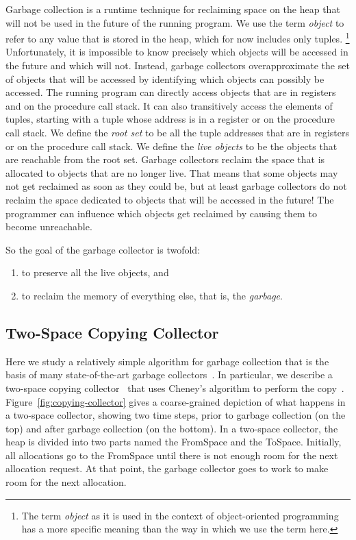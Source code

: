 \documentclass[7x10]{TimesAPriori_MIT}%
\numberwithin{theorem}{chapter}
\numberwithin{definition}{chapter}
\numberwithin{equation}{chapter}
\begin{document}
Garbage collection is a runtime technique for reclaiming space on the
heap that will not be used in the future of the running program. We
use the term \emph{object} to refer to any
value that is stored in the heap, which for now includes only
tuples.%
%
\footnote{The term \emph{object} as it is used in the context of
  object-oriented programming has a more specific meaning than the
  way in which we use the term here.}
%
Unfortunately, it is impossible to know precisely which objects will
be accessed in the future and which will not.  Instead, garbage
collectors overapproximate the set of objects that will be accessed by
identifying which objects can possibly be accessed.  The running
program can directly access objects that are in registers and on the
procedure call stack. It can also transitively access the elements of
tuples, starting with a tuple whose address is in a register or on the
procedure call stack.  We define the \emph{root
set} to be all the tuple addresses that are
in registers or on the procedure call stack.  We define the \emph{live
objects} to be the objects that are
reachable from the root set. Garbage collectors reclaim the space that
is allocated to objects that are no longer live. 
That means that some objects may not get reclaimed as soon as they could be,
but at least
garbage collectors do not reclaim the space dedicated to objects that
will be accessed in the future! The programmer can influence which
objects get reclaimed by causing them to become unreachable.

So the goal of the garbage collector is twofold:
\begin{enumerate}
\item to preserve all the live objects, and
\item to reclaim the memory of everything else, that is, the \emph{garbage}.
\end{enumerate}

\subsection{Two-Space Copying Collector}

Here we study a relatively simple algorithm for garbage collection
that is the basis of many state-of-the-art garbage
collectors~\citep{Lieberman:1983aa,Ungar:1984aa,Jones:1996aa,Detlefs:2004aa,Dybvig:2006aa,Tene:2011kx}. In
particular, we describe a two-space copying
collector~\citep{Wilson:1992fk} that uses Cheney's algorithm to
perform the copy~\citep{Cheney:1970aa}.   
Figure~\ref{fig:copying-collector} gives a coarse-grained depiction of
what happens in a two-space collector, showing two time steps, prior
to garbage collection (on the top) and after garbage collection (on
the bottom). In a two-space collector, the heap is divided into two
parts named the FromSpace and the
ToSpace.  Initially, all allocations go to the
FromSpace until there is not enough room for the next allocation
request. At that point, the garbage collector goes to work to make
room for the next allocation.
\end{document}
